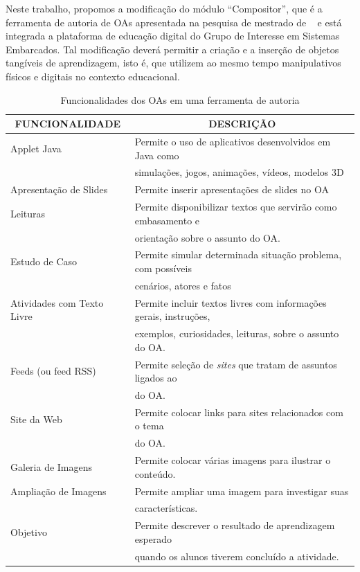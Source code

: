 Neste trabalho, propomos a modificação do módulo ``Compositor'', que é a ferramenta de autoria de OAs apresentada na pesquisa de mestrado de ~\cite{leitao:2017} e está integrada a plataforma de educação digital do Grupo de Interesse em Sistemas Embarcados. Tal modificação deverá permitir a criação e a inserção de objetos tangíveis de aprendizagem, isto é, que utilizem ao mesmo tempo manipulativos físicos e digitais no contexto educacional.

\begin{table}[htbp]
	\caption{Funcionalidades dos OAs em uma ferramenta de autoria}
	\begin{tabular}{|l|l|}
		\hline
		\multicolumn{1}{|c|}{\textbf{FUNCIONALIDADE}} & \multicolumn{1}{c|}{\textbf{DESCRIÇÃO}} \\ \hline
		Applet Java & Permite o uso de aplicativos desenvolvidos em Java como \\ &simulações, jogos, animações, vídeos, modelos 3D \\ \hline
		Apresentação de Slides & Permite inserir apresentações de slides no OA \\ \hline
		Leituras & Permite disponibilizar textos que servirão como embasamento e \\ &orientação sobre o assunto do OA. \\ \hline
		Estudo de Caso & Permite simular determinada situação problema, com possíveis \\ &cenários, atores e fatos \\ \hline
		Atividades com Texto Livre & Permite incluir textos livres com informações gerais, instruções, \\ &exemplos, curiosidades, leituras, sobre o assunto do OA.  \\ \hline
		Feeds (ou feed RSS) & Permite seleção de \textit{sites} que tratam de assuntos ligados ao \\&do OA.  \\ \hline
		Site da Web & Permite colocar links para sites relacionados com o tema \\&do OA. \\ \hline
		Galeria de Imagens & Permite colocar várias imagens para ilustrar o conteúdo. \\ \hline
		Ampliação de Imagens & Permite ampliar uma imagem para investigar suas \\&características. \\ \hline
		Objetivo & Permite descrever o resultado de aprendizagem esperado \\ &quando os alunos tiverem concluído a atividade.  \\ \hline

\end{tabular}
\end{table}
